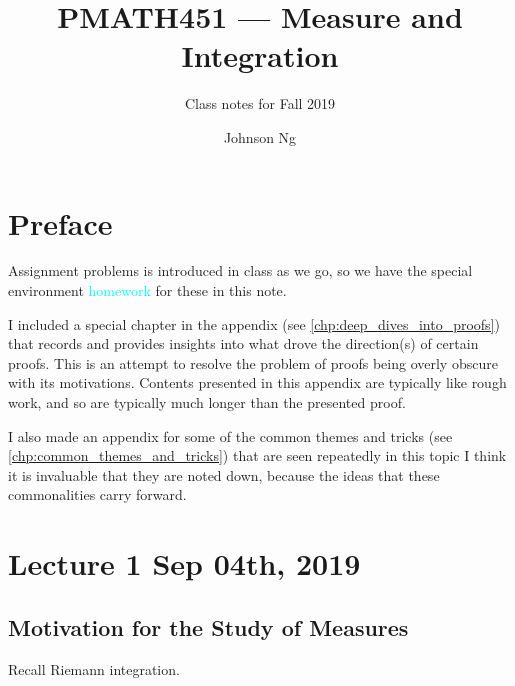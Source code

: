 \documentclass[notoc,notitlepage]{tufte-book}
\title{PMATH451 --- Measure and Integration}
\author{Johnson Ng}
\subtitle{Class notes for Fall 2019}
\begin{document}

\clearpage
\begin{fullwidth}
  \renewcommand{\listtheoremname}{\textsl{List of Homework}}
  \listoftheorems[ignoreall, show={homework}]
\end{fullwidth}

\chapter*{Preface}%
\label{chp:preface}

\nocite{folland1999}
\nocite{halmos1974}

Assignment problems is introduced in class as we go,
so we have the special environment \textcolor{cyan}{homework}
for these in this note.

I included a special chapter in the appendix (see
\cref{chp:deep_dives_into_proofs}) that records and provides
insights into what drove the direction(s) of certain proofs.
This is an attempt to resolve the problem of proofs
being overly obscure with its motivations.
Contents presented in this appendix are typically like rough work,
and so are typically much longer than the presented proof.

I also made an appendix for some of the common themes and tricks
(see \cref{chp:common_themes_and_tricks})
that are seen repeatedly in this topic
I think it is invaluable that they are noted down, because the ideas
that these commonalities carry forward.


\chapter{Lecture 1 Sep 04th, 2019}%
\label{chp:lecture_1_sep_04th_2019}

\section{Motivation for the Study of Measures}%
\label{sec:motivation_for_the_study_of_measures}

Recall Riemann integration.
\end{document}
